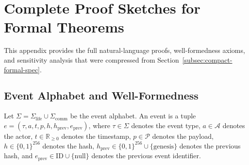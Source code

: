 \section{Complete Proof Sketches for Formal Theorems}\label{app:proofs}

This appendix provides the full natural-language proofs, well-formedness axioms, and sensitivity analysis that were compressed from Section~\ref{subsec:compact-formal-spec}.

\subsection{Event Alphabet and Well-Formedness}

Let $\Sigma = \Sigma_{\text{life}} \cup \Sigma_{\text{comm}}$ be the event alphabet. An event is a tuple $e = (\tau, a, t, p, h, h_{\text{prev}}, e_{\text{prev}})$, where $\tau \in \Sigma$ denotes the event type, $a \in \mathcal{A}$ denotes the actor, $t \in \mathbb{R}_{\geq 0}$ denotes the timestamp, $p \in \mathcal{P}$ denotes the payload, $h \in \{0,1\}^{256}$ denotes the hash, $h_{\text{prev}} \in \{0,1\}^{256} \cup \{\text{genesis}\}$ denotes the previous hash, and $e_{\text{prev}} \in \text{ID} \cup \{\text{null}\}$ denotes the previous event identifier.

